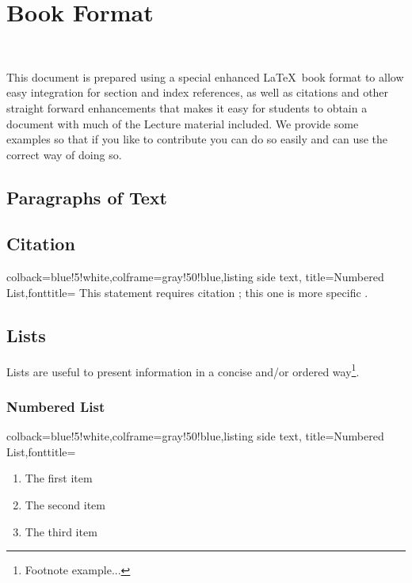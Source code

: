 

\chapter{Book Format}

\FILENAME\

This document is prepared using a special enhanced \LaTeX~book format to allow
easy integration for section and index references, as well as
citations and other straight forward enhancements that makes it easy
for students to obtain a document with much of the Lecture material
included. We provide some examples so that if you like to contribute
you can do so easily and can use the correct way of doing so.


\section{Paragraphs of Text}

\lipsum[1] %


\section{Citation}

\begin{tcblisting}{colback=blue!5!white,colframe=gray!50!blue,listing side text,
  title=Numbered List,fonttitle=\bfseries}
This statement requires citation \cite{article_key}; 
this one is more specific \cite[162]{book_key}.
\end{tcblisting}


\section{Lists}

Lists are useful to present information in a concise and/or ordered way\footnote{Footnote example...}.

\subsection{Numbered List}

\begin{tcblisting}{colback=blue!5!white,colframe=gray!50!blue,listing side text,
  title=Numbered List,fonttitle=\bfseries}
\begin{enumerate}
\item The first item
\item The second item
\item The third item
\end{enumerate}
\end{tcblisting}


